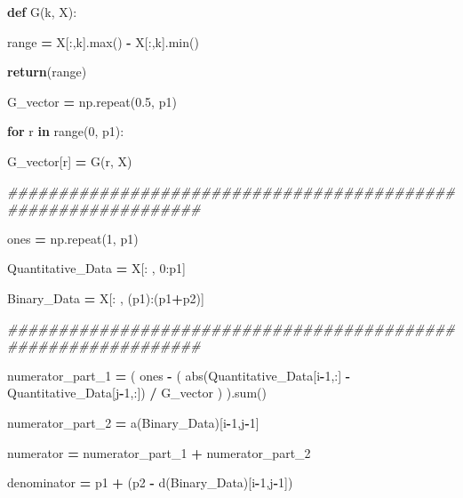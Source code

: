 \documentclass[
  11pt,
  a4paper,
]{article}
\newenvironment{Shaded}{\begin{snugshade}}{\end{snugshade}}
\newcommand{\BuiltInTok}[1]{#1}
\newcommand{\CommentTok}[1]{\textcolor[rgb]{0.56,0.35,0.01}{\textit{#1}}}
\newcommand{\ControlFlowTok}[1]{\textcolor[rgb]{0.13,0.29,0.53}{\textbf{#1}}}
\newcommand{\DecValTok}[1]{\textcolor[rgb]{0.00,0.00,0.81}{#1}}
\newcommand{\FloatTok}[1]{\textcolor[rgb]{0.00,0.00,0.81}{#1}}
\newcommand{\KeywordTok}[1]{\textcolor[rgb]{0.13,0.29,0.53}{\textbf{#1}}}
\newcommand{\NormalTok}[1]{#1}
\newcommand{\OperatorTok}[1]{\textcolor[rgb]{0.81,0.36,0.00}{\textbf{#1}}}
\begin{document}
\begin{Shaded}
\begin{Highlighting}[]
            \KeywordTok{def}\NormalTok{ G(k, X):}

                \BuiltInTok{range} \OperatorTok{=}\NormalTok{ X[:,k].}\BuiltInTok{max}\NormalTok{() }\OperatorTok{{-}}\NormalTok{ X[:,k].}\BuiltInTok{min}\NormalTok{() }

                \ControlFlowTok{return}\NormalTok{(}\BuiltInTok{range}\NormalTok{)}

\NormalTok{            G\_vector }\OperatorTok{=}\NormalTok{ np.repeat(}\FloatTok{0.5}\NormalTok{, p1)}

            \ControlFlowTok{for}\NormalTok{ r }\KeywordTok{in} \BuiltInTok{range}\NormalTok{(}\DecValTok{0}\NormalTok{, p1):}

\NormalTok{                G\_vector[r] }\OperatorTok{=}\NormalTok{ G(r, X)}
                
\CommentTok{\#\#\#\#\#\#\#\#\#\#\#\#\#\#\#\#\#\#\#\#\#\#\#\#\#\#\#\#\#\#\#\#\#\#\#\#\#\#\#\#\#\#\#\#\#\#\#\#\#\#\#\#\#\#\#\#\#\#\#\#\#\#\#}
    
\NormalTok{            ones }\OperatorTok{=}\NormalTok{ np.repeat(}\DecValTok{1}\NormalTok{, p1)}

\NormalTok{            Quantitative\_Data }\OperatorTok{=}\NormalTok{ X[: , }\DecValTok{0}\NormalTok{:p1]}

\NormalTok{            Binary\_Data }\OperatorTok{=}\NormalTok{ X[: , (p1):(p1}\OperatorTok{+}\NormalTok{p2)]}
         
 
\CommentTok{\#\#\#\#\#\#\#\#\#\#\#\#\#\#\#\#\#\#\#\#\#\#\#\#\#\#\#\#\#\#\#\#\#\#\#\#\#\#\#\#\#\#\#\#\#\#\#\#\#\#\#\#\#\#\#\#\#\#\#\#\#\#\#}

\NormalTok{            numerator\_part\_1 }\OperatorTok{=}\NormalTok{ ( ones }\OperatorTok{{-}}\NormalTok{ ( }\BuiltInTok{abs}\NormalTok{(Quantitative\_Data[i}\OperatorTok{{-}}\DecValTok{1}\NormalTok{,:] }\OperatorTok{{-}}\NormalTok{ Quantitative\_Data[j}\OperatorTok{{-}}\DecValTok{1}\NormalTok{,:]) }\OperatorTok{/}\NormalTok{ G\_vector ) ).}\BuiltInTok{sum}\NormalTok{() }

\NormalTok{            numerator\_part\_2 }\OperatorTok{=}\NormalTok{ a(Binary\_Data)[i}\OperatorTok{{-}}\DecValTok{1}\NormalTok{,j}\OperatorTok{{-}}\DecValTok{1}\NormalTok{] }
     
\NormalTok{            numerator }\OperatorTok{=}\NormalTok{ numerator\_part\_1 }\OperatorTok{+}\NormalTok{ numerator\_part\_2}

\NormalTok{            denominator }\OperatorTok{=}\NormalTok{ p1 }\OperatorTok{+}\NormalTok{ (p2 }\OperatorTok{{-}}\NormalTok{ d(Binary\_Data)[i}\OperatorTok{{-}}\DecValTok{1}\NormalTok{,j}\OperatorTok{{-}}\DecValTok{1}\NormalTok{])  }


\end{Highlighting}
\end{Shaded}
\end{document}
